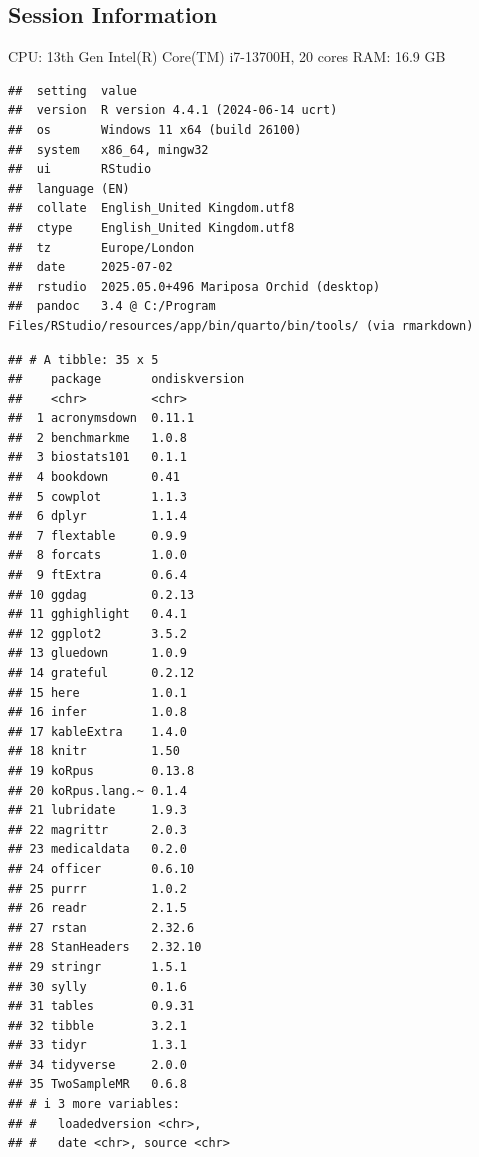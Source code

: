 \documentclass[
]{article}
\begin{document}
\subsection{Session Information}\label{Session-Information}

CPU: 13th Gen Intel(R) Core(TM) i7-13700H, 20 cores \newline
RAM: 16.9 GB

\begin{verbatim}
##  setting  value
##  version  R version 4.4.1 (2024-06-14 ucrt)
##  os       Windows 11 x64 (build 26100)
##  system   x86_64, mingw32
##  ui       RStudio
##  language (EN)
##  collate  English_United Kingdom.utf8
##  ctype    English_United Kingdom.utf8
##  tz       Europe/London
##  date     2025-07-02
##  rstudio  2025.05.0+496 Mariposa Orchid (desktop)
##  pandoc   3.4 @ C:/Program Files/RStudio/resources/app/bin/quarto/bin/tools/ (via rmarkdown)
\end{verbatim}

\begin{verbatim}
## # A tibble: 35 x 5
##    package       ondiskversion
##    <chr>         <chr>        
##  1 acronymsdown  0.11.1       
##  2 benchmarkme   1.0.8        
##  3 biostats101   0.1.1        
##  4 bookdown      0.41         
##  5 cowplot       1.1.3        
##  6 dplyr         1.1.4        
##  7 flextable     0.9.9        
##  8 forcats       1.0.0        
##  9 ftExtra       0.6.4        
## 10 ggdag         0.2.13       
## 11 gghighlight   0.4.1        
## 12 ggplot2       3.5.2        
## 13 gluedown      1.0.9        
## 14 grateful      0.2.12       
## 15 here          1.0.1        
## 16 infer         1.0.8        
## 17 kableExtra    1.4.0        
## 18 knitr         1.50         
## 19 koRpus        0.13.8       
## 20 koRpus.lang.~ 0.1.4        
## 21 lubridate     1.9.3        
## 22 magrittr      2.0.3        
## 23 medicaldata   0.2.0        
## 24 officer       0.6.10       
## 25 purrr         1.0.2        
## 26 readr         2.1.5        
## 27 rstan         2.32.6       
## 28 StanHeaders   2.32.10      
## 29 stringr       1.5.1        
## 30 sylly         0.1.6        
## 31 tables        0.9.31       
## 32 tibble        3.2.1        
## 33 tidyr         1.3.1        
## 34 tidyverse     2.0.0        
## 35 TwoSampleMR   0.6.8        
## # i 3 more variables:
## #   loadedversion <chr>,
## #   date <chr>, source <chr>
\end{verbatim}

\newpage
\end{document}
